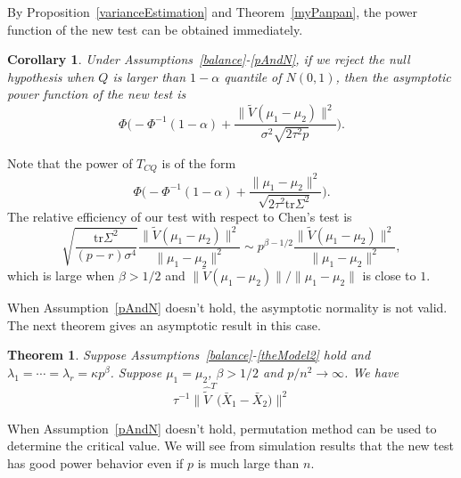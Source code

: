 \documentclass[review]{elsarticle}
\theoremstyle{plain}
\newtheorem{theorem}{\quad\quad Theorem}
\newtheorem{corollary}{\quad\quad Corollary}
\theoremstyle{definition}
\newtheorem{remark}{\quad\quad Remark}
\theoremstyle{remark}
\begin{document}

By Proposition~\ref{varianceEstimation}  and Theorem~\ref{myPanpan}, the power function of the new test can be obtained immediately.


\begin{corollary}\label{testPowerh}
    Under Assumptions~\ref{balance}-\ref{pAndN},
    if we reject the null hypothesis when $Q$ is larger than $1-\alpha$ quantile of $N(0,1)$, then the asymptotic power function of the new test is
    \begin{equation*}
        \Phi\Big(-\Phi^{-1}(1-\alpha)+\frac{\|\tilde{V}(\mu_1-\mu_2)\|^2}{\sigma^2\sqrt{2\tau^2p}}\Big).
    \end{equation*}
\end{corollary}


 Note that the power of $T_{CQ}$ is of the form
\begin{equation*}
    \Phi\Big(-\Phi^{-1}(1-\alpha)+\frac{\|\mu_1-\mu_2\|^2}{\sqrt{2\tau^2\mathrm{tr}\Sigma^2}}\Big).
\end{equation*}
 The relative efficiency of our test with respect to Chen's test is
\begin{equation*}
    \sqrt{\frac{\mathrm{tr}\Sigma^2}{(p-r)\sigma^4}}\frac{\|\tilde{V}(\mu_1-\mu_2)\|^2}{\|\mu_1-\mu_2\|^2}\sim p^{\beta-1/2}\frac{\|\tilde{V}(\mu_1-\mu_2)\|^2}{\|\mu_1-\mu_2\|^2},
\end{equation*}
which is large when $\beta>1/2$ and $\|\tilde{V}(\mu_1-\mu_2)\|/\|\mu_1-\mu_2\|$ is close to $1$.


When Assumption~\ref{pAndN} doesn't hold, the asymptotic normality is not valid.
The next theorem  gives an asymptotic result in this case.
\begin{theorem}\label{chilimthm}
    Suppose Assumptions~\ref{balance}-\ref{theModel2} hold and $\lambda_1=\cdots=\lambda_r=\kappa p^{\beta}$.
    Suppose $\mu_1=\mu_2$, $\beta>1/2$ and $p/n^2\to \infty$. We have 
\begin{equation*}
\tau^{-1}\big\|\hat{\tilde{V}}^T\big(\bar{X}_1-\bar{X}_2\big)\big\|^2
\end{equation*}
\end{theorem}
When Assumption~\ref{pAndN} doesn't hold,  permutation method can be used to determine the critical value.
We will see from simulation results that the new test has good power behavior even if $p$ is much large than $n$.
\end{document}
